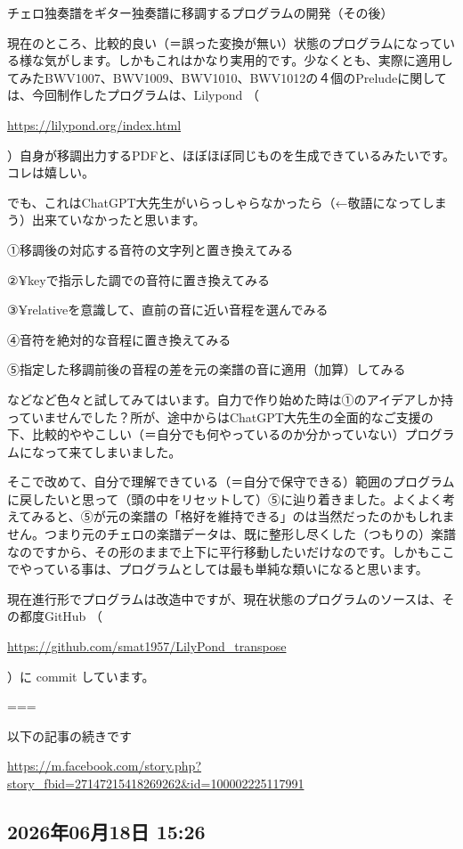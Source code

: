 \documentclass[facebook_diary.tex]{subfiles}
\begin{document}
チェロ独奏譜をギター独奏譜に移調するプログラムの開発（その後）


現在のところ、比較的良い（＝誤った変換が無い）状態のプログラムになっている様な気がします。しかもこれはかなり実用的です。少なくとも、実際に適用してみたBWV1007、BWV1009、BWV1010、BWV1012の４個のPreludeに関しては、今回制作したプログラムは、Lilypond （ 

\url{https://lilypond.org/index.html}

 ）自身が移調出力するPDFと、ほぼほぼ同じものを生成できているみたいです。コレは嬉しい。

でも、これはChatGPT大先生がいらっしゃらなかったら（←敬語になってしまう）出来ていなかったと思います。


①移調後の対応する音符の文字列と置き換えてみる

②¥keyで指示した調での音符に置き換えてみる

③¥relativeを意識して、直前の音に近い音程を選んでみる

④音符を絶対的な音程に置き換えてみる

⑤指定した移調前後の音程の差を元の楽譜の音に適用（加算）してみる


などなど色々と試してみてはいます。自力で作り始めた時は①のアイデアしか持っていませんでした？所が、途中からはChatGPT大先生の全面的なご支援の下、比較的ややこしい（＝自分でも何やっているのか分かっていない）プログラムになって来てしまいました。


そこで改めて、自分で理解できている（＝自分で保守できる）範囲のプログラムに戻したいと思って（頭の中をリセットして）⑤に辿り着きました。よくよく考えてみると、⑤が元の楽譜の「格好を維持できる」のは当然だったのかもしれません。つまり元のチェロの楽譜データは、既に整形し尽くした（つもりの）楽譜なのですから、その形のままで上下に平行移動したいだけなのです。しかもここでやっている事は、プログラムとしては最も単純な類いになると思います。


現在進行形でプログラムは改造中ですが、現在状態のプログラムのソースは、その都度GitHub （ 

\url{https://github.com/smat1957/LilyPond_transpose}

 ）に commit しています。


===

以下の記事の続きです

\url{https://m.facebook.com/story.php?story_fbid=27147215418269262&id=100002225117991}



\subsection*{2026年06月18日 15:26}
\end{document}
